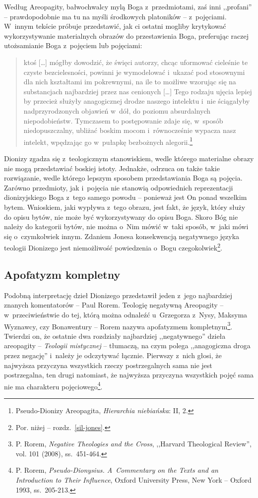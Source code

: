 Według Areopagity, bałwochwalcy mylą Boga z~przedmiotami, zaś inni ,,profani'' -- prawdopodobnie ma tu na myśli środkowych platoników -- z~pojęciami. W~innym tekście próbuje przedstawić, jak ci ostatni mogliby krytykować wykorzystywanie materialnych obrazów do przestawienia Boga, preferując raczej utożsamianie Boga z~pojęciem lub pojęciami:

\begin{quote}
ktoś [\ldots] mógłby dowodzić, że święci autorzy, chcąc uformować cieleśnie te czyste bezcielesności, powinni je wymodelować i~ukazać pod stosownymi dla nich kształtami im pokrewnymi, na ile to możliwe wzorując się na substancjach najbardziej przez nas cenionych [\ldots] Tego rodzaju ujęcia lepiej by przecież służyły anagogicznej drodze naszego intelektu i~nie ściągałyby nadprzyrodzonych objawień w~dół, do poziomu absurdalnych niepodobieństw. Tymczasem to postępowanie zdaje się, w~sposób niedopuszczalny, ubliżać boskim mocom i~równocześnie wypacza nasz intelekt, wpędzając go w~pułapkę bezbożnych alegorii.\footnote{Pseudo-Dionizy Areopagita, \textit{Hierarchia niebiańska}: II, 2.}
\end{quote}

Dionizy zgadza się z~teologicznym stanowiskiem, wedle którego materialne obrazy nie mogą przedstawiać boskiej istoty. Jednakże, odrzuca on także takie rozwiązanie, wedle którego lepszym sposobem przedstawiania Boga są pojęcia. Zarówno przedmioty, jak i~pojęcia nie stanowią odpowiednich reprezentacji dionizyjskiego Boga z~tego samego powodu -- ponieważ jest On ponad wszelkim bytem. Wnioskiem, jaki wypływa z~tego obrazu, jest fakt, że język, który służy do opisu bytów, nie może być wykorzystywany do opisu Boga. Skoro Bóg nie należy do kategorii bytów, nie można o~Nim mówić w~taki sposób, w~jaki mówi się o~czymkolwiek innym. Zdaniem Jonesa konsekwencją negatywnego języka teologii Dionizego jest niemożliwość powiedzenia o~Bogu czegokolwiek\footnote{Por. niżej -- rozdz.~\ref{sil-jones}.}.


\subsection*{Apofatyzm kompletny}

Podobną interpretację dzieł Dionizego przedstawił jeden z~jego najbardziej znanych komentatorów -- Paul Rorem. Teologię negatywną Areopagity -- w~przeciwieństwie do tej, którą można odnaleźć u~Grzegorza z~Nysy, Maksyma Wyznawcy, czy Bonawentury -- Rorem nazywa apofatyzmem kompletnym\footnote{P. Rorem, \textit{Negative Theologies and the Cross}, ,,Harvard Theological Review'', vol. 101 (2008), ss.~451-464.}. Twierdzi on, że ostatnie dwa rozdziały najbardziej ,,negatywnego'' dzieła areopagity -- \textit{Teologii mistycznej} -- tłumaczą, na czym polega ,,anagogiczna droga przez negację'' i~należy je odczytywać łącznie. Pierwszy z~nich głosi, że najwyższa przyczyna wszystkich rzeczy postrzegalnych sama nie jest postrzegalna, ten drugi natomiast, że najwyższa przyczyna wszystkich pojęć sama nie ma charakteru pojęciowego\footnote{P. Rorem, \textit{Pseudo-Dionysius. A~Commentary on the Texts and an Introduction to Their Influence}, Oxford University Press, New York -- Oxford 1993, ss.~205-213.}.

